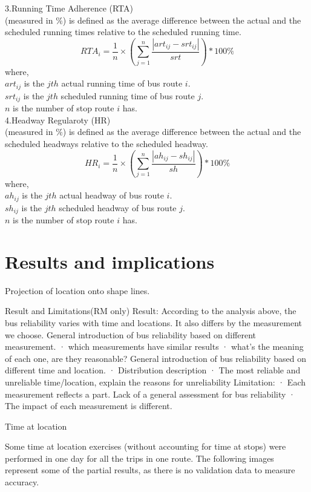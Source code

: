 \documentclass[12pt,journal,compsoc]{IEEEtran}
\begin{document}
3.Running Time Adherence (RTA)\\
(measured in $\%$) is defined as the average difference between the actual and the scheduled running times relative to the scheduled running time. 
$$RTA_i = \frac{1}{n}\times\left( \sum_{j=1}^n \frac{|art_{ij}-srt_{ij}|}{srt} \right) * 100\%$$
where,\\
$art_{ij}$ is the $jth$ actual running time of bus route $i$.\\
$srt_{ij}$ is the $jth$ scheduled running time of bus route $j$.\\
$n$ is the number of stop route $i$ has.\\

4.Headway Regularoty (HR)\\
(measured in $\%$) is defined as the average difference between the actual and the scheduled headways relative to the scheduled headway. 
$$HR_i = \frac{1}{n}\times\left( \sum_{j=1}^n \frac{|ah_{ij}-sh_{ij}|}{sh} \right) * 100\%$$
where,\\
$ah_{ij}$ is the $jth$ actual headway of bus route $i$.\\
$sh_{ij}$ is the $jth$ scheduled headway of bus route $j$.\\
$n$ is the number of stop route $i$ has.\\



\section{Results and implications}

Projection of location onto shape lines.



 
Result and Limitations(RM only)
Result:
According to the analysis above, the bus reliability varies with time and locations. It also differs by the measurement we choose.
General introduction of bus reliability based on different measurement.
·      which measurements have similar results
·      what’s the meaning of each one, are they reasonable?
General introduction of bus reliability based on different time and location.
·      Distribution description
·      The most reliable and unreliable time/location, explain the reasons for unreliability
Limitation:
·      Each measurement reflects a part. Lack of a general assessment for bus reliability
·      The impact of each measurement is different.


Time at location

Some time at location exercises (without accounting for time at stops) were performed in one day for all the trips in one route. The following images represent some of the partial results, as there is no validation data to measure accuracy.
\end{document}
